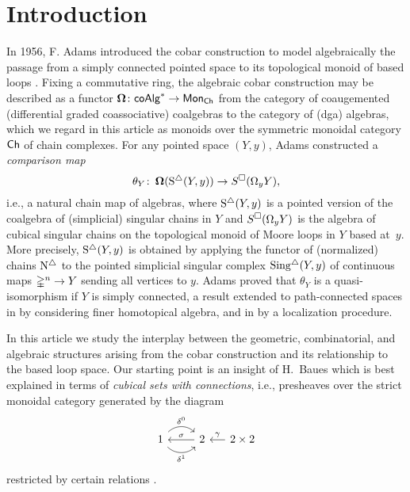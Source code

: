 
\section{Introduction}

In 1956, F. Adams introduced the cobar construction to model algebraically the passage from a simply connected pointed space to its topological monoid of based loops \cite{adams1956cobar}.
Fixing a commutative ring, the algebraic cobar construction may be described as a functor $\operatorname{\mathbf{\Omega}} \colon \mathsf{coAlg}^* \to \mathsf{Mon}_{\mathsf{Ch}}$ from the category of coaugemented  (differential graded coassociative) coalgebras to the category of (dga) algebras, which we regard in this article as monoids over the symmetric monoidal category $\mathsf{Ch}$ of chain complexes.
For any pointed space $(Y, y)$, Adams constructed a \textit{comparison map}
\begin{equation} \label{e:adams map}
\theta_Y \colon \operatorname{\mathbf{\Omega}}(\operatorname{S^{\triangle}}(Y, y)) \to S^{\square}(\Omega_y Y),
\end{equation}
i.e., a natural chain map of algebras, where $\operatorname{S^{\triangle}}(Y,y)$ is a pointed version of the coalgebra of (simplicial) singular chains in $Y$ and $S^{\square}(\Omega_yY)$ is the algebra of cubical singular chains on the topological monoid of Moore loops in $Y$ based at~$y$.
More precisely, $\operatorname{S^{\triangle}}(Y,y)$ is obtained by applying the functor of (normalized) chains $\operatorname{N^{\triangle}}$ to the pointed simplicial singular complex $\operatorname{Sing^{\triangle}}(Y, y)$ of continuous maps $\mathbb{\Delta}^n \to Y$ sending all vertices to $y$.
Adams proved that $\theta_Y$ is a quasi-isomorphism if $Y$ is simply connected, a result extended to path-connected spaces in \cite{rivera2018cubical} by considering finer homotopical algebra, and in \cite{hess2010cobar} by a localization procedure.

In this article we study the interplay between the geometric, combinatorial, and algebraic structures arising from the cobar construction and its relationship to the based loop space.
Our starting point is an insight of H.~Baues which is best explained in terms of \textit{cubical sets with connections}, i.e., presheaves over the 
strict monoidal category generated by the diagram
\begin{equation*}
\begin{tikzcd}
1 \arrow[r, out=45, in=135, "\delta^0"] \arrow[r, out=-45, in=-135, "\delta^1"'] & 2 \arrow[l, "\sigma"'] &[-10pt] \arrow[l, "\gamma"'] 2 \times 2
\end{tikzcd}
\end{equation*}
restricted by certain relations \cite{brown1981cubes, grandis2003cubical}.

